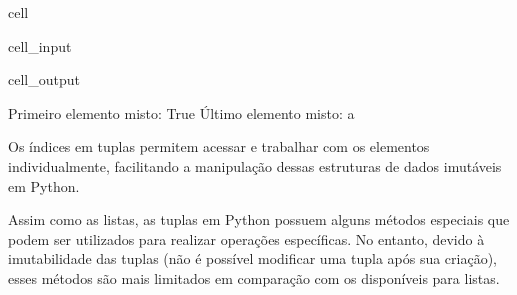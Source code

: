 \documentclass[letterpaper,10pt,english]{jupyterBook}
\begin{document}
\begin{sphinxuseclass}{cell}\begin{sphinxVerbatimInput}

\begin{sphinxuseclass}{cell_input}
\begin{sphinxVerbatim}[commandchars=\\\{\}]
     

  \PYG{p}{[}\PYG{p}{]}
  \PYG{p}{[}\PYG{p}{]}

 
 
\end{sphinxVerbatim}

\end{sphinxuseclass}\end{sphinxVerbatimInput}
\begin{sphinxVerbatimOutput}

\begin{sphinxuseclass}{cell_output}
\begin{sphinxVerbatim}[commandchars=\\\{\}]
Primeiro elemento misto: True
Último elemento misto: a
\end{sphinxVerbatim}

\end{sphinxuseclass}\end{sphinxVerbatimOutput}

\end{sphinxuseclass}
\sphinxAtStartPar
Os índices em tuplas permitem acessar e trabalhar com os elementos individualmente, facilitando a manipulação dessas estruturas de dados imutáveis em Python.

\sphinxAtStartPar
Assim como as listas, as tuplas em Python possuem alguns métodos especiais que podem ser utilizados para realizar operações específicas. No entanto, devido à imutabilidade das tuplas (não é possível modificar uma tupla após sua criação), esses métodos são mais limitados em comparação com os disponíveis para listas.
\end{document}
